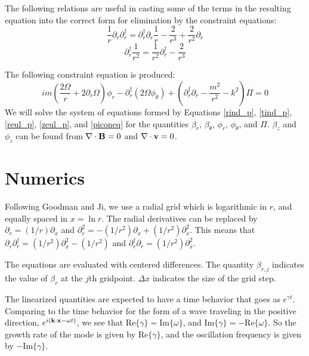 \documentclass[letterpaper]{article}
\begin{document}
The following relations are useful in casting some of the terms in the
resulting equation into the correct form for elimination by the
constraint equations:
\begin{equation}
\frac{1}{r}\partial_r \partial_r^\dagger = \partial_r^\dagger \partial_r \frac{1}{r} - \frac{2}{r^3} + \frac{2}{r^2}\partial_r
\end{equation}
\begin{equation}
\partial_r^\dagger \frac{1}{r^2} = \frac{1}{r^2} \partial_r^\dagger - \frac{2}{r^3}
\end{equation}

The following constraint equation is produced:
\begin{equation}\label{piconeq}
im\left(\frac{2\Omega}{r}+2\partial_r \Omega\right)\phi_r - \partial_r^\dagger\left(2\Omega\phi_\theta\right)+\left(\partial_r^\dagger \partial_r - \frac{m^2}{r^2}-k^2\right)\Pi = 0
\end{equation}
We will solve the system of equations formed by Equations
\ref{rind_p}, \ref{tind_p}, \ref{reul_p}, \ref{zeul_p}, and
\ref{piconeq} for the quantities $\beta_r$, $\beta_\theta$, $\phi_r$,
$\phi_\theta$, and $\Pi$.  $\beta_z$ and $\phi_z$ can be found from
$\nabla\cdot{\bf B}=0$ and $\nabla\cdot{\bf v}=0$.
\section{Numerics}

Following Goodman and Ji, we use a radial grid which is logarithmic in
$r$, and equally spaced in $x=\ln{r}$.  The radial derivatives can
be replaced by $\partial_r = (1/r)\partial_x$ and $\partial_r^2 =
-(1/r^2)\partial_x + (1/r^2)\partial_x^2$.  This means that
$\partial_r \partial_r^\dagger = (1/r^2)\partial_x^2 - (1/r^2)$ and
$\partial_r^\dagger \partial_r = (1/r^2)\partial_x^2$.

The equations are evaluated with centered differences.  The quantity
$\beta_{r,j}$ indicates the value of $\beta_r$ at the $j$th
gridpoint. $\Delta x$ indicates the size of the grid step.

The linearized quantities are expected to have a time behavior that
goes as $e^{\gamma t}$. Comparing to the time behavior for the form of
a wave traveling in the positive direction,
$e^{i({\bf k} \cdot {\bf x} - \omega t)}$, we see that
$\mathrm{Re}\{\gamma\} = \mathrm{Im}\{\omega\}$, and
$\mathrm{Im}\{\gamma\} = -\mathrm{Re}\{\omega\}$. So the growth rate of the
mode is given by $\mathrm{Re}\{\gamma\}$, and the oscillation frequency is
given by $-\mathrm{Im}\{\gamma\}$.
\end{document}
